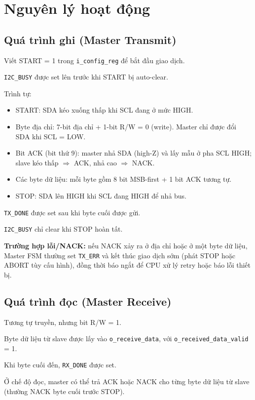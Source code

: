 \section{Nguyên lý hoạt động}

\subsection{Quá trình ghi (Master Transmit)}
Viết START = 1 trong \texttt{i\_config\_reg} để bắt đầu giao dịch.

\texttt{I2C\_BUSY} được set lên trước khi START bị auto-clear.

Trình tự:
\begin{itemize}[leftmargin=1.2cm]
    \item START: SDA kéo xuống thấp khi SCL đang ở mức HIGH.
    \item Byte địa chỉ: 7-bit địa chỉ + 1-bit R/W = 0 (write). Master chỉ được đổi SDA khi SCL = LOW.
    \item Bit ACK (bit thứ 9): master nhả SDA (high-Z) và lấy mẫu ở pha SCL HIGH; slave kéo thấp $\Rightarrow$ ACK, nhả cao $\Rightarrow$ NACK.
    \item Các byte dữ liệu: mỗi byte gồm 8 bit MSB-first + 1 bit ACK tương tự.
    \item STOP: SDA lên HIGH khi SCL đang HIGH để nhả bus.
\end{itemize}

\texttt{TX\_DONE} được set sau khi byte cuối được gửi.

\texttt{I2C\_BUSY} chỉ clear khi STOP hoàn tất.

\textbf{Trường hợp lỗi/NACK:} nếu NACK xảy ra ở địa chỉ hoặc ở một byte dữ liệu, Master FSM thường set \texttt{TX\_ERR} và kết thúc giao dịch sớm (phát STOP hoặc ABORT tùy cấu hình), đồng thời báo ngắt để CPU xử lý retry hoặc báo lỗi thiết bị.

\subsection{Quá trình đọc (Master Receive)}
Tương tự truyền, nhưng bit R/W = 1.

Byte dữ liệu từ slave được lấy vào \texttt{o\_receive\_data}, với \texttt{o\_received\_data\_valid} = 1.

Khi byte cuối đến, \texttt{RX\_DONE} được set.

Ở chế độ đọc, master có thể trả ACK hoặc NACK cho từng byte dữ liệu từ slave (thường NACK byte cuối trước STOP).

